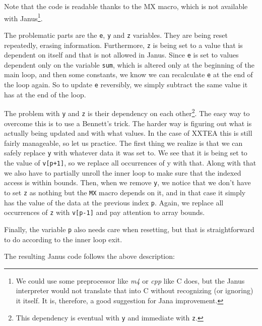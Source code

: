 \documentclass[a4paper,10pt,openright]{memoir}
\newcommand{\term}[1]{\textit{#1}}
\newcommand{\code}[1]{\texttt{#1}}
\begin{document}
Note that the code is readable thanks to the MX macro, which is not 
available with Janus\footnote{We could use some preprocessor like 
\term{m4} or \term{cpp} like C does, but the Janus interpreter would 
not translate that into C without recognizing (or ignoring) it 
itself. It is, therefore, a good suggestion for Jana improvement.}.

The problematic parts are the \code{e}, \code{y} and \code{z} 
variables. They are being reset repeatedly, erasing information. 
Furthermore, \code{z} is being set to a value that is dependent on 
itself and that is not allowed in Janus. Since \code{e} is set to 
values dependent only on the variable \code{sum}, which is altered only 
at the beginning of the main loop, and then some constants, we know we 
can recalculate \code{e} at the end of the loop again. So to update 
\code{e} reversibly, we simply subtract the same value it has at the 
end of the loop.

The problem with \code{y} and \code{z} is their dependency on each 
other\footnote{This dependency is eventual with \code{y} and immediate 
with \code{z}.}. The easy way to overcome this is to use a Bennett's 
trick. The harder way is figuring out what is actually being updated 
and with what values. In the case of XXTEA this is still fairly 
manageable, so let us practice. The first thing we realize is that we 
can safely replace \code{y} with whatever data it was set to. We see 
that it is being set to the value of \code{v[p+1]}, so we replace all 
occurrences of y with that. Along with that we also have to partially 
unroll the inner loop to make sure that the indexed access is within 
bounds. Then, when we remove \code{y}, we notice that we don't have to 
set \code{z} as nothing but the \code{MX} macro depends on it, and in 
that case it simply has the value of the data at the previous index 
\code{p}. Again, we replace all occurrences of \code{z} with 
\code{v[p-1]} and pay attention to array bounds.

Finally, the variable \code{p} also needs care when resetting, but that 
is straightforward to do according to the inner loop exit.

The resulting Janus code follows the above description:
\end{document}
